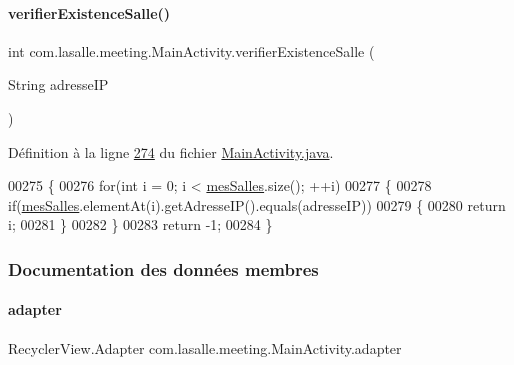 \paragraph{\texorpdfstring{verifier\+Existence\+Salle()}{verifierExistenceSalle()}\hspace{0.1cm}{\footnotesize\ttfamily [2/2]}}
{\footnotesize\ttfamily int com.\+lasalle.\+meeting.\+Main\+Activity.\+verifier\+Existence\+Salle (\begin{DoxyParamCaption}\item[{String}]{adresse\+IP }\end{DoxyParamCaption})}



Définition à la ligne \hyperlink{_main_activity_8java_source_l00274}{274} du fichier \hyperlink{_main_activity_8java_source}{Main\+Activity.\+java}.


\begin{DoxyCode}
00275     \{
00276         \textcolor{keywordflow}{for}(\textcolor{keywordtype}{int} i = 0; i < \hyperlink{classcom_1_1lasalle_1_1meeting_1_1_main_activity_ab13e34516d877abc3ba937505b441979}{mesSalles}.size(); ++i)
00277         \{
00278             \textcolor{keywordflow}{if}(\hyperlink{classcom_1_1lasalle_1_1meeting_1_1_main_activity_ab13e34516d877abc3ba937505b441979}{mesSalles}.elementAt(i).getAdresseIP().equals(adresseIP))
00279             \{
00280                 \textcolor{keywordflow}{return} i;
00281             \}
00282         \}
00283         \textcolor{keywordflow}{return} -1;
00284     \}
\end{DoxyCode}


\subsubsection{Documentation des données membres}
\mbox{\label{classcom_1_1lasalle_1_1meeting_1_1_main_activity_ac0af1346d6f4b3b4bd549b324c0523cc}} 
\paragraph{\texorpdfstring{adapter}{adapter}}
{\footnotesize\ttfamily Recycler\+View.\+Adapter com.\+lasalle.\+meeting.\+Main\+Activity.\+adapter\hspace{0.3cm}{\ttfamily [private]}}




